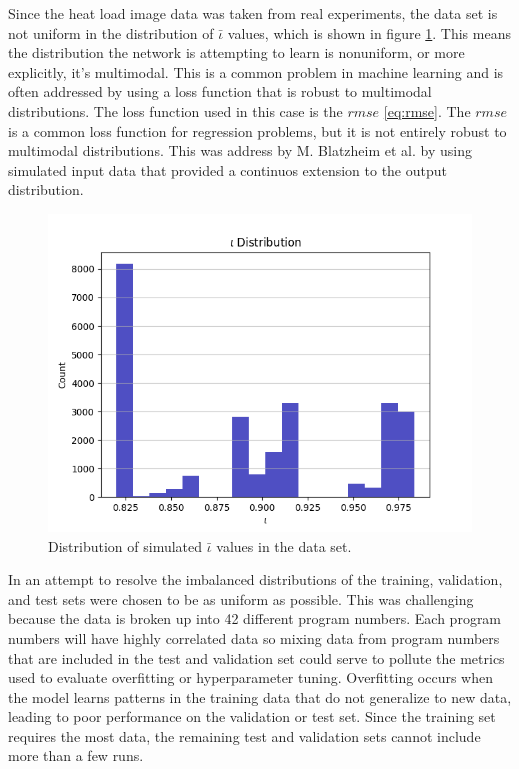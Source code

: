Since the heat load image data was taken from real experiments, the data set is not uniform in the distribution of $\bar{\iota}$ values, which is shown in figure \ref{fig:data:iota_dist}. This means the distribution the network is attempting to learn is nonuniform, or more explicitly, it's multimodal. This is a common problem in machine learning and is often addressed by using a loss function that is robust to multimodal distributions. The loss function used in this case is the $rmse$ \ref{eq:rmse}. The $rmse$ is a common loss function for regression problems, but it is not entirely robust to multimodal distributions. This was address by M. Blatzheim et al.\cite{Blatzheim_2018} by using simulated input data that provided a continuos extension to the output distribution.

\begin{figure}[htb]
	\includegraphics[width=\textwidth]{images/iota-dist.png}
	\caption{Distribution of simulated $\bar{\iota}$ values in the data set.}
	\label{fig:data:iota_dist}
\end{figure}

In an attempt to resolve the imbalanced distributions of the training, validation, and test sets were chosen to be as uniform as possible. This was challenging because the data is broken up into 42 different program numbers. Each program numbers will have highly correlated data so mixing data from program numbers that are included in the test and validation set could serve to pollute the metrics used to evaluate overfitting or hyperparameter tuning. Overfitting occurs when the model learns patterns in the training data that do not generalize to new data, leading to poor performance on the validation or test set. Since the training set requires the most data, the remaining test and validation sets cannot include more than a few runs.

